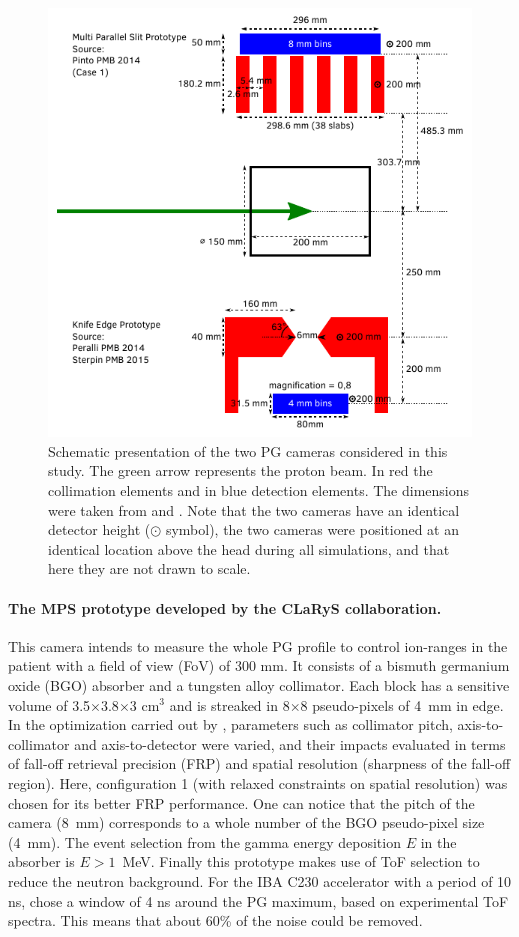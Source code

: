 \documentclass[a4paper,english,12pt]{article}
\begin{document}
\begin{figure}[htp]
  \centering
  \includegraphics[width=0.8\linewidth]{detectors_cyl}
  \caption{Schematic presentation of the two PG cameras considered in this study. The green arrow represents the proton beam. In red the collimation elements and in blue detection elements. The dimensions were taken from \cite{Pinto2014a} and \cite{Perali2014,Sterpin2015}. Note that the two cameras have an identical detector height ($\odot$ symbol), the two cameras were positioned at an identical location above the head during all simulations, and that here they are not drawn to scale.}
  \label{fig:detectors}
\end{figure}

\paragraph{The MPS prototype developed by the CLaRyS collaboration.}
This camera intends to measure the whole PG profile to control ion-ranges in the patient with a field of view (FoV) of 300 mm. It consists of a bismuth germanium oxide (BGO) absorber and a tungsten alloy collimator. Each block has a sensitive volume of 3.5$\times$3.8$\times$3 cm$^{3}$ and is streaked in 8$\times$8 pseudo-pixels of 4~mm in edge. In the optimization carried out by \cite{Pinto2014a}, parameters such as collimator pitch, axis-to-collimator and axis-to-detector were varied, and their impacts evaluated in terms of fall-off retrieval precision (FRP) and spatial resolution (sharpness of the fall-off region). Here, configuration 1 (with relaxed constraints on spatial resolution) was chosen for its better FRP performance. One can notice that the pitch of the camera (8~mm) corresponds to a whole number of the BGO pseudo-pixel size (4~mm). The event selection from the gamma energy deposition $E$ in the absorber is $E>1$~MeV. Finally this prototype makes use of ToF selection to reduce the neutron background. For the IBA C230 accelerator with a period of 10 ns, \cite{Pinto2014a} chose a window of 4 ns around the PG maximum, based on experimental ToF spectra. This means that about 60\% of the noise could be removed.
\end{document}
